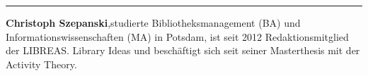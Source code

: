 \begin{center}\rule{0.5\linewidth}{\linethickness}\end{center}

\textbf{Christoph Szepanski},studierte Bibliotheksmanagement (BA) und
Informationswissenschaften (MA) in Potsdam, ist seit 2012
Redaktionsmitglied der LIBREAS. Library Ideas und beschäftigt sich seit
seiner Masterthesis mit der Activity Theory.

